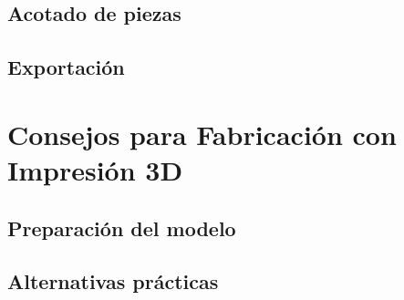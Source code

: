 


\subsection{Acotado de piezas}

\subsection{Exportación}

\section{Consejos para Fabricación con Impresión 3D}

\subsection{Preparación del modelo}

\subsection{Alternativas prácticas}


